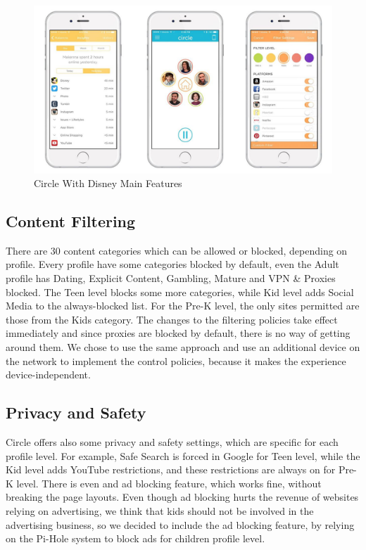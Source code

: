 \begin{figure}[th]
\centering
\includegraphics[width=1\textwidth]{Figures/circle}
\decoRule
\caption{Circle With Disney Main Features}
\label{fig:circle}
\end{figure}

\subsection{Content Filtering}

There are 30 content categories which can be allowed or blocked, depending on profile. Every profile have some categories blocked by default, even the Adult profile has Dating, Explicit Content, Gambling, Mature and VPN \& Proxies blocked. The Teen level blocks some more categories, while Kid level adds Social Media to the always-blocked list. For the Pre-K level, the only sites permitted are those from the Kids category. The changes to the filtering policies take effect immediately and since proxies are blocked by default, there is no way of getting around them. We chose to use the same approach and use an additional device on the network to implement the control policies, because it makes the experience device-independent.

\subsection{Privacy and Safety}

Circle offers also some privacy and safety settings, which are specific for each profile level. For example, Safe Search is forced in Google for Teen level, while the Kid level adds YouTube restrictions, and these restrictions are always on for Pre-K level.
There is even and ad blocking feature, which works fine, without breaking the page layouts. Even though ad blocking hurts the revenue of websites relying on advertising, we think that kids should not be involved in the advertising business, so we decided to include the ad blocking feature, by relying on the Pi-Hole \citep{salmela2015pihole} system to block ads for children profile level.

